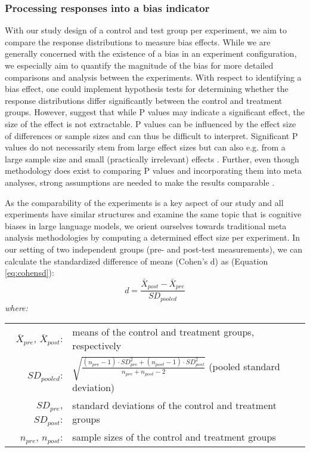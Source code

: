\subsubsection{Processing responses into a bias indicator}
\label{methodologies:biasdetector}
\par With our study design of a control and test group per experiment, we aim to compare the response distributions to measure bias effects. While we are generally concerned with the existence of a bias in an experiment configuration, we especially aim to quantify the magnitude of the bias for more detailed comparisons and analysis between the experiments. With respect to identifying a bias effect, one could implement hypothesis tests for determining whether the response distributions differ significantly between the control and treatment groups. However, \textcite{sullivan2012using} suggest that while P values may indicate a significant effect, the size of the effect is not extractable. P values can be influenced by the effect size of differences or sample sizes and can thus be difficult to interpret. Significant P values do not necessarily stem from large effect sizes but can also e.g. from a large sample size and small (practically irrelevant) effects \parencite{borenstein2021introduction,sullivan2012using}. Further, even though methodology does exist to comparing P values and incorporating them into meta analyses, strong assumptions are needed to make the results comparable \parencite{borenstein2021introduction}.

\par As the comparability of the experiments is a key aspect of our study and all experiments have similar structures and examine the same topic that is cognitive biases in large language models, we orient ourselves towards traditional meta analysis methodologies by computing a determined effect size per experiment. In our setting of two independent groups (pre- and post-test measurements), we can calculate the standardized difference of means (Cohen's d) as \parencite{borenstein2021introduction,cooper2019handbook, goulet2018review,morris2002combining, nakagawa2023quantitative} (Equation \ref{eq:cohensd}):
\begin{equation} \label{eq:cohensd}
d = \frac{\bar{X}_{post} - \bar{X}_{pre}}{SD_{pooled}}
\end{equation}
\hspace{0.5cm} \textit{where:} \\
\hspace*{3em}
\begin{tabular}{rl}
    $\bar{X}_{pre}$, $\bar{X}_{post}$:& means of the control and treatment groups, respectively \\
    $SD_{pooled}$:& $\sqrt{\frac{(n_{pre} - 1) \cdot SD_{pre}^2 + (n_{post} - 1) \cdot SD_{post}^2}{n_{pre} + n_{post} - 2}}$ (pooled standard deviation) \\
    $SD_{pre}$, $SD_{post}$:& standard deviations of the control and treatment groups \\
    $n_{pre}$, $n_{post}$:& sample sizes of the control and treatment groups
\end{tabular} \\

